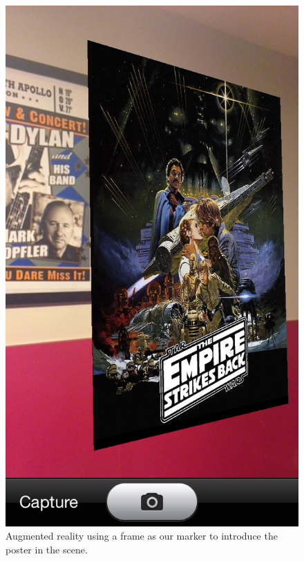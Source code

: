 \begin{figure}
\centering
\includegraphics[scale=0.45]{img/track01.JPG}
\caption{\label{fig:track01} Augmented reality using a frame as our marker to
  introduce the poster in the scene.}
\end{figure} 

